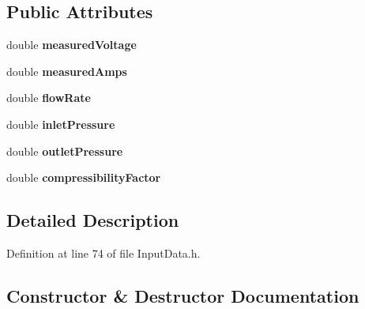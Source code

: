 \subsection*{Public Attributes}
\begin{DoxyCompactItemize}
\item 
\mbox{\label{struct_fan_1_1_field_data_modified_a453a1b579cabebf6d9290f17fbc99ea9}} 
double {\bfseries measured\+Voltage}
\item 
\mbox{\label{struct_fan_1_1_field_data_modified_a847588f365f094940b7877ed64f52d89}} 
double {\bfseries measured\+Amps}
\item 
\mbox{\label{struct_fan_1_1_field_data_modified_a15a9f9d55ca86b6ae2e35b9aa8ad4ff2}} 
double {\bfseries flow\+Rate}
\item 
\mbox{\label{struct_fan_1_1_field_data_modified_a695deafadc8221b19bbdfcdea142c73e}} 
double {\bfseries inlet\+Pressure}
\item 
\mbox{\label{struct_fan_1_1_field_data_modified_af07f26dff548735202cb53cbb98afc51}} 
double {\bfseries outlet\+Pressure}
\item 
\mbox{\label{struct_fan_1_1_field_data_modified_aebcb81efa08a8472052ae07ec9c816b0}} 
double {\bfseries compressibility\+Factor}
\end{DoxyCompactItemize}


\subsection{Detailed Description}


Definition at line 74 of file Input\+Data.\+h.



\subsection{Constructor \& Destructor Documentation}
\mbox{\label{struct_fan_1_1_field_data_modified_adef6a41f34fefd1acf3253d30fb4048d}} 
